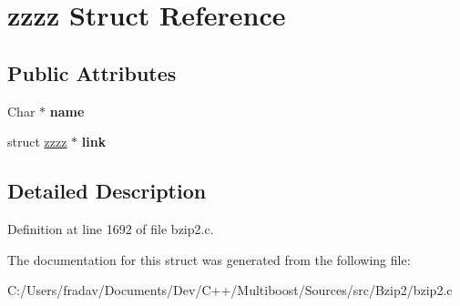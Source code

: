 \hypertarget{structzzzz}{\section{zzzz Struct Reference}
\label{structzzzz}
}
\subsection*{Public Attributes}
\begin{DoxyCompactItemize}
\item 
\hypertarget{structzzzz_a934fe2a8af78f77477372732fe35e954}{Char $\ast$ {\bfseries name}}\label{structzzzz_a934fe2a8af78f77477372732fe35e954}

\item 
\hypertarget{structzzzz_a978114e9b920122d882575349496f4cc}{struct \hyperlink{structzzzz}{zzzz} $\ast$ {\bfseries link}}\label{structzzzz_a978114e9b920122d882575349496f4cc}

\end{DoxyCompactItemize}


\subsection{Detailed Description}


Definition at line 1692 of file bzip2.\-c.



The documentation for this struct was generated from the following file\-:\begin{DoxyCompactItemize}
\item 
C\-:/\-Users/fradav/\-Documents/\-Dev/\-C++/\-Multiboost/\-Sources/src/\-Bzip2/bzip2.\-c\end{DoxyCompactItemize}
